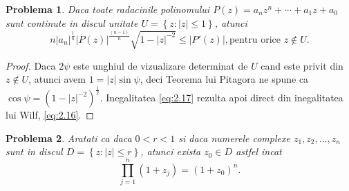 \documentclass[a4paper,12pt,oneside]{report}
\newtheorem{problem}{Problema}
\begin{document}
\begin{problem}
Daca toate radacinile polinomului \(P\left ( z \right ) = a_{n}z^{n} +\cdots +a_{1}z + a_{0}\) sunt continute in discul unitate \(U= \left \{ z: \left | z \right |\leq 1 \right \}\), atunci
\begin{displaymath}
    n\left | a_{n} \right |^{\frac{1}{n}}\left | P\left ( z \right ) \right |^{\frac{\left ( n-1 \right )}{n}}\sqrt{1 - \left | z \right |^{-2}}\leq \left | {P}'\left ( z \right ) \right |, \text{pentru orice } z\notin U. \label{eq:2.17} \tag{2.17}
\end{displaymath}
\end{problem}
\begin{proof}
Daca \(2\psi\) este unghiul de vizualizare determinat de \(U\) cand este privit din \(z \notin U\), atunci avem \(1 = \left | z \right |\sin\psi\), deci Teorema lui Pitagora ne spune ca \(\cos\psi = \left ( 1 - \left | z \right |^{-2} \right )^{\frac{1}{2}}\). Inegalitatea  \ref{eq:2.17} rezulta apoi direct din inegalitatea lui Wilf, \ref{eq:2.16}.
\end{proof}
\begin{problem}
Aratati ca daca \(0 < r < 1\) si daca numerele complexe \(z_{1}, z_{2},...,z_{n}\) sunt in discul \(D = \left \{ z: \left | z \right | \leq r\right \}\), atunci exista \(z_{0} \in D\) astfel incat
\begin{displaymath}
    \prod_{j = 1}^{n}\left ( 1 + z_{j} \right ) = \left ( 1 + z_{0} \right )^{n}.\label{eq:2.18} \tag{2.18}
\end{displaymath}
\end{problem}
\end{document}
